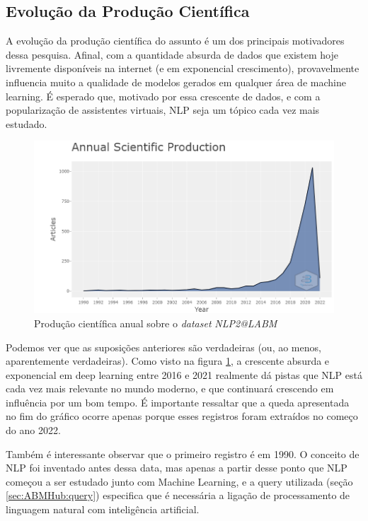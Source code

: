 \subsection{Evolução da Produção Científica}

A evolução da produção científica do assunto é um dos principais motivadores dessa pesquisa. Afinal, com a quantidade absurda de dados que existem hoje livremente disponíveis na internet (e em exponencial crescimento), provavelmente influencia muito a qualidade de modelos gerados em qualquer área de machine learning. É esperado que, motivado por essa crescente de dados, e com a popularização de assistentes virtuais, NLP seja um tópico cada vez mais estudado.

 \begin{figure}
    \centering
    \includegraphics[width=1\textwidth]{experiments/ABMHub/PesquisaBibliometrica/NLP/anualScientificProduction.png}
    \caption{Produção científica anual sobre o \textit{dataset} \textit{NLP2@LABM}}
    \label{fig:ABMHub:ASP}
\end{figure}

Podemos ver que as suposições anteriores são verdadeiras (ou, ao menos, aparentemente verdadeiras). Como visto na figura \ref{fig:ABMHub:ASP}, a crescente absurda e exponencial em deep learning entre 2016 e 2021 realmente dá pistas que NLP está cada vez mais relevante no mundo moderno, e que continuará crescendo em influência por um bom tempo. É importante ressaltar que a queda apresentada no fim do gráfico ocorre apenas porque esses registros foram extraídos no começo do ano 2022.

Também é interessante observar que o primeiro registro é em 1990. O conceito de NLP foi inventado antes dessa data, mas apenas a partir desse ponto que NLP começou a ser estudado junto com Machine Learning, e a query utilizada (seção \ref{sec:ABMHub:query}) especifica que é necessária a ligação de processamento de linguagem natural com inteligência artificial.

